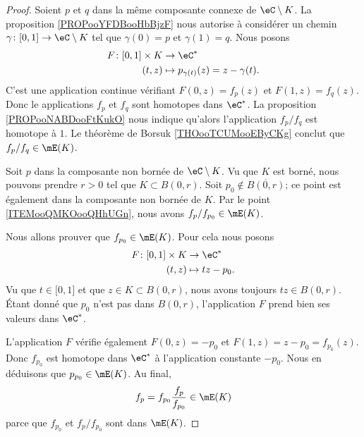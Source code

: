 \begin{proof}
	Soient \( p\) et \( q\) dans la même composante connexe de \( \eC\setminus K\). La proposition \ref{PROPooYFDBooHbBjzF} nous autorise à considérer un chemin \( \gamma\colon \mathopen[ 0 , 1 \mathclose]\to \eC\setminus K\) tel que \( \gamma(0)=p\) et \( \gamma(1)=q\). Nous posons
	\begin{equation}
		\begin{aligned}
			F\colon \mathopen[ 0 , 1 \mathclose]\times K & \to \eC^*                             \\
			(t,z)                                        & \mapsto p_{\gamma(t)}(z)=z-\gamma(t).
		\end{aligned}
	\end{equation}
	C'est une application continue vérifiant \( F(0,z)=f_p(z)\) et \( F(1,z)=f_q(z)\). Donc le applications \( f_p\) et \( f_q\) sont homotopes dans \( \eC^*\). La proposition \ref{PROPooNABDooFtKukO} nous indique qu'alors l'application \( f_p/f_q\) est homotope à \( 1\). Le théorème de Borsuk \ref{THOooTCUMooEByCKg} conclut que \( f_p/f_q\in\mE(K)\).

	Soit \( p\) dans la composante non bornée de \( \eC\setminus K\). Vu que \( K\) est borné, nous pouvons prendre \( r>0\) tel que \( K\subset B(0,r)\). Soit \( p_0\notin \overline{ B(0,r) }\); ce point est également dans la composante non bornée de \( K\). Par le point \ref{ITEMooQMKOooQHhUGn}, nous avons \( f_p/f_{p_0}\in\mE(K)\).

	Nous allons prouver que \( f_{p_0}\in \mE(K)\). Pour cela nous posons
	\begin{equation}
		\begin{aligned}
			F\colon \mathopen[ 0 , 1 \mathclose]\times K & \to \eC^*       \\
			(t,z)                                        & \mapsto tz-p_0.
		\end{aligned}
	\end{equation}
	Vu que \( t\in \mathopen[ 0 , 1 \mathclose]\) et que \( z\in K\subset B(0,r)\), nous avons toujours \( tz\in B(0,r)\). Étant donné que \( p_0\) n'est pas dans \( B(0,r)\), l'application \( F\) prend bien ses valeurs dans \( \eC^*\).

	L'application \( F\) vérifie également \( F(0,z)=-p_0\) et \( F(1,z)=z-p_0=f_{p_0}(z)\). Donc \( f_{p_0}\) est homotope dans \( \eC^*\) à l'application constante \( -p_0\). Nous en déduisons que \( p_{p_0}\in\mE(K)\). Au final,
	\begin{equation}
		f_p=f_{p_0}\frac{ f_p }{ f_{p_0} }\in \mE(K)
	\end{equation}
	parce que \( f_{p_0}\) et \( f_p/f_{p_0}\) sont dans \( \mE(K)\).
\end{proof}

